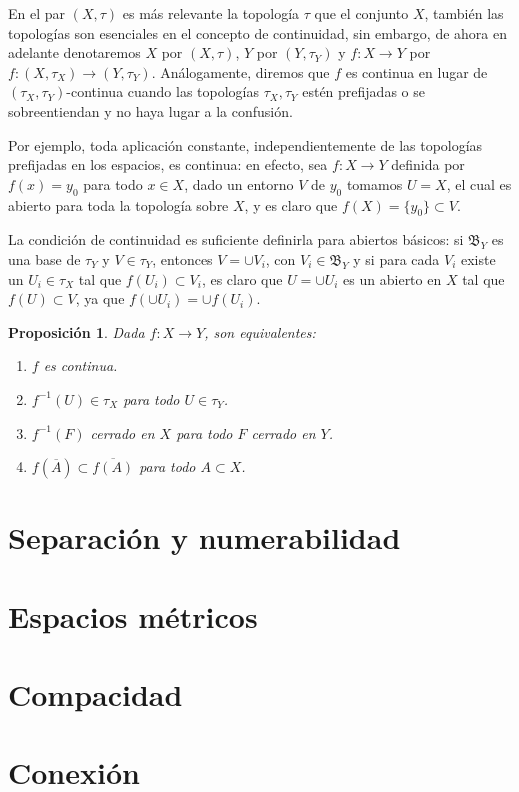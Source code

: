 \documentclass[12pt]{article}
\newtheorem{proposition}[theorem]{Proposición}
\begin{document}
En el par $(X, \tau)$ es más relevante la topología $\tau$ que el conjunto $X$, también las topologías son esenciales en el concepto de continuidad, sin embargo, de ahora en adelante denotaremos $X$ por $(X, \tau)$, $Y$ por $(Y, \tau_Y)$ y $f \colon X \longrightarrow Y$ por $f \colon (X, \tau_X) \longrightarrow (Y, \tau_Y)$. Análogamente, diremos que $f$ es continua en lugar de $(\tau_X, \tau_Y)$-continua cuando las topologías $\tau_X, \tau_Y$ estén prefijadas o se sobreentiendan y no haya lugar a la confusión.

Por ejemplo, toda aplicación constante, independientemente de las topologías prefijadas en los espacios, es continua: en efecto, sea $f \colon X \longrightarrow Y$ definida por $f(x) = y_0$ para todo $x \in X$, dado un entorno $V$ de $y_0$ tomamos $U = X$, el cual es abierto para toda la topología sobre $X$, y es claro que $f(X) = \lbrace y_0 \rbrace \subset V$.

La condición de continuidad es suficiente definirla para abiertos básicos: si $\mathfrak{B}_Y$ es una base de $\tau_Y$ y $V \in \tau_Y$, entonces $V = \cup V_i$, con $V_i \in \mathfrak{B}_Y$ y si para cada $V_i$ existe un $U_i \in \tau_X$ tal que $f(U_i) \subset V_i$, es claro que $U = \cup U_i$ es un abierto en $X$ tal que $f(U) \subset V$, ya que $f(\cup U_i) = \cup f(U_i)$.

\begin{proposition}Dada $f \colon X \longrightarrow Y$, son equivalentes:
\begin{enumerate}
\item $f$ es continua.
\item $f^{-1}(U) \in \tau_X$ para todo $U \in \tau_Y$.
\item $f^{-1}(F)$ cerrado en $X$ para todo $F$ cerrado en $Y$.
\item $f(\overline{A}) \subset \overline{f(A)}$ para todo $A \subset X$.
\end{enumerate}
\end{proposition}

\section{Separación y numerabilidad}
\section{Espacios métricos}
\section{Compacidad}
\section{Conexión}
\end{document}

